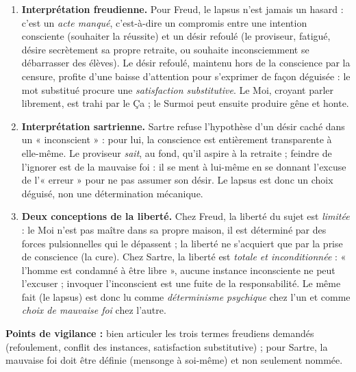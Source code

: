 \documentclass[11pt]{article}
\newcommand{\cle}[1]{{\popxbold\color{popdark}#1}}
\begin{document}
\begin{corrige}
\begin{enumerate}
    \item \textbf{Interprétation freudienne.} Pour Freud, le lapsus n'est jamais un hasard : c'est un \emph{acte manqué}, c'est-à-dire un compromis entre une intention consciente (souhaiter la réussite) et un désir refoulé (le proviseur, fatigué, désire secrètement sa propre retraite, ou souhaite inconsciemment se débarrasser des élèves). Le désir refoulé, maintenu hors de la conscience par la censure, profite d'une baisse d'attention pour s'exprimer de façon déguisée : le mot substitué procure une \emph{satisfaction substitutive}. Le Moi, croyant parler librement, est trahi par le Ça ; le Surmoi peut ensuite produire gêne et honte.
    \item \textbf{Interprétation sartrienne.} Sartre refuse l'hypothèse d'un désir caché dans un « inconscient » : pour lui, la conscience est entièrement transparente à elle-même. Le proviseur \emph{sait}, au fond, qu'il aspire à la retraite ; feindre de l'ignorer est de la \cle{mauvaise foi} : il se ment à lui-même en se donnant l'excuse de l'« erreur » pour ne pas assumer son désir. Le lapsus est donc un choix déguisé, non une détermination mécanique.
    \item \textbf{Deux conceptions de la liberté.} Chez Freud, la liberté du sujet est \emph{limitée} : le Moi n'est pas maître dans sa propre maison, il est déterminé par des forces pulsionnelles qui le dépassent ; la liberté ne s'acquiert que par la prise de conscience (la cure). Chez Sartre, la liberté est \emph{totale et inconditionnée} : « l'homme est condamné à être libre », aucune instance inconsciente ne peut l'excuser ; invoquer l'inconscient est une fuite de la responsabilité. Le même fait (le lapsus) est donc lu comme \emph{déterminisme psychique} chez l'un et comme \emph{choix de mauvaise foi} chez l'autre.
\end{enumerate}
\textbf{Points de vigilance :} bien articuler les trois termes freudiens demandés (refoulement, conflit des instances, satisfaction substitutive) ; pour Sartre, la mauvaise foi doit être définie (mensonge à soi-même) et non seulement nommée.
\end{corrige}
\end{document}
